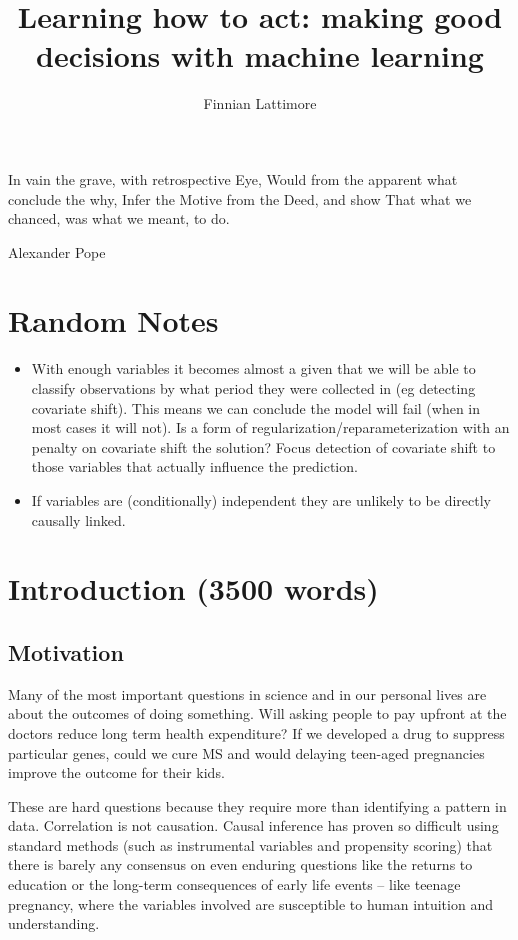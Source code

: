 \documentclass[11pt,a4paper,oneside]{book}
\author{Finnian Lattimore}
\title{Learning how to act: making good decisions with machine learning}
\begin{document}
\def\ci{\perp\!\!\!\perp} %
\newtheorem{theorem}{Theorem}[section]
\newtheorem{definition}{Definition}[section]
\maketitle

\epigraph{In vain the grave, with retrospective Eye,
Would from the apparent what conclude the why,
Infer the Motive from the Deed, and show
That what we chanced, was what we meant, to do.}{Alexander Pope}

\chapter{Random Notes}
\begin{itemize}
\item With enough variables it becomes almost a given that we will be able to classify observations by what period they were collected in (eg detecting covariate shift). This means we can conclude the model will fail (when in most cases it will not). Is a form of regularization/reparameterization with an penalty on covariate shift the solution? Focus detection of covariate shift to those variables that actually influence the prediction.

\item If variables are (conditionally) independent they are unlikely to be directly causally linked. 
\end{itemize}


\chapter*{Introduction (3500 words)}


\section*{Motivation}
Many of the most important questions in science and in our personal lives are about the outcomes of doing something. Will asking people to pay upfront at the doctors reduce long term health expenditure? If we developed a drug to suppress particular genes, could we cure MS and would delaying teen-aged pregnancies improve the outcome for their kids.  

These are hard questions because they require more than identifying a pattern in data. Correlation is not causation. Causal inference has proven so difficult using standard methods (such as instrumental variables and propensity scoring) that there is barely any consensus on even enduring questions like the returns to education or the long-term consequences of early life events – like teenage pregnancy, where the variables involved are susceptible to human intuition and understanding. 
\end{document}
